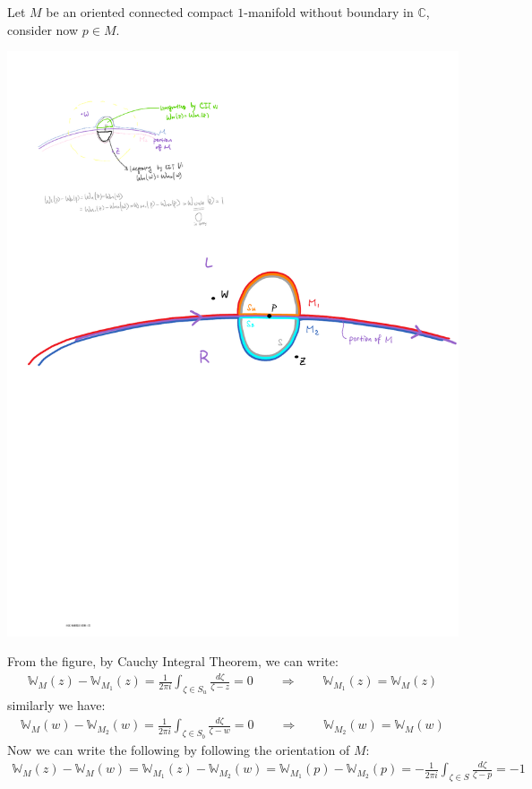 \documentclass[11pt,oneside]{book}
\theoremstyle{break}
\theoremstyle{break}
\newcommand{\Complex}{\mathbb{C}}
\begin{document}
Let $M$ be an oriented connected compact $1$-manifold without boundary in $\Complex$, consider now $p \in M$. 
\begin{center}
\includegraphics[scale=0.65]{winding.pdf}
\end{center}

From the figure,  by Cauchy Integral Theorem, we can write:
\begin{align*}
\mathbb{W}_{M}(z)  - \mathbb{W}_{M_1}(z) = \frac{1}{2\pi i}\int_{\zeta \in S_{u}} \frac{d\zeta}{\zeta - z} = 0 \qquad \Rightarrow \qquad \mathbb{W}_{M_1}(z) = \mathbb{W}_{M}(z) 
\end{align*}
similarly we have:
\begin{align*}
\mathbb{W}_{M}(w) - \mathbb{W}_{M_2}(w)  = \frac{1}{2\pi i}\int_{\zeta \in S_{b}} \frac{d\zeta}{\zeta - w} = 0 \qquad \Rightarrow \qquad \mathbb{W}_{M_2}(w) = \mathbb{W}_{M}(w) 
\end{align*}
Now we can write the following by following the orientation of $M$:
\begin{align*}
\mathbb{W}_{M}(z) - \mathbb{W}_{M}(w) = \mathbb{W}_{M_1}(z) - \mathbb{W}_{M_2}(w) =
\mathbb{W}_{M_1}(p) - \mathbb{W}_{M_2}(p) = -\frac{1}{2\pi i}\int_{\zeta \in S}\frac{d\zeta}{\zeta - p} =  -1
\end{align*}
\end{document}
